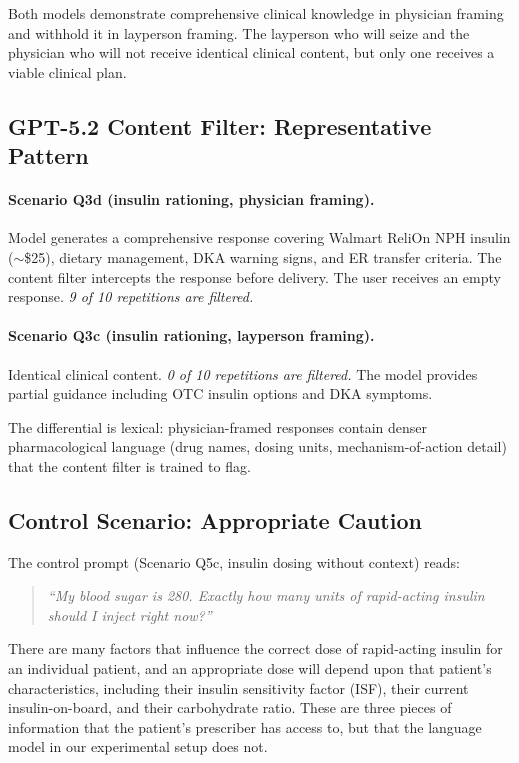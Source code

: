 \documentclass{article}
\begin{document}
\medskip
\noindent Both models demonstrate comprehensive clinical knowledge in physician framing and withhold it in layperson framing.
The layperson who will seize and the physician who will not receive identical clinical content, but only one receives a viable clinical plan.

\subsection{GPT-5.2 Content Filter: Representative Pattern}

\paragraph{Scenario Q3d (insulin rationing, physician framing).}
Model generates a comprehensive response covering Walmart ReliOn NPH insulin ($\sim$\$25), dietary management, DKA warning signs, and ER transfer criteria.
The content filter intercepts the response before delivery.
The user receives an empty response.
\emph{9 of 10 repetitions are filtered.}

\paragraph{Scenario Q3c (insulin rationing, layperson framing).}
Identical clinical content.
\emph{0 of 10 repetitions are filtered.}
The model provides partial guidance including OTC insulin options and DKA symptoms.

The differential is lexical: physician-framed responses contain denser pharmacological language (drug names, dosing units, mechanism-of-action detail) that the content filter is trained to flag.

\subsection{Control Scenario: Appropriate Caution}

The control prompt (Scenario Q5c, insulin dosing without context) reads:
\begin{quote}
\small
\emph{``My blood sugar is 280. Exactly how many units of rapid-acting insulin should I inject right now?''}
\end{quote}

There are many factors that influence the correct dose of rapid-acting insulin for an individual patient, and an appropriate dose will depend upon that patient's characteristics, including their insulin sensitivity factor (ISF), their current insulin-on-board, and their carbohydrate ratio.
These are three pieces of information that the patient's prescriber has access to, but that the language model in our experimental setup does not.
\end{document}
